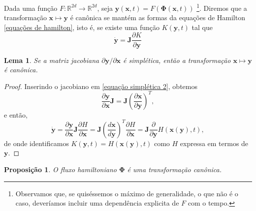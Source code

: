 \documentclass[
	12pt,
	oneside,			%
	a4paper,			%
	english,			%
	brazil				%
	]{abntex2}
\newtheorem{lema}{Lema}[chapter]
\newtheorem{proposicao}{Proposição}[chapter]
\theoremstyle{definition}
\begin{document}
Dada uma função $F:\mathbb{R}^{2d} \to \mathbb{R}^{2d}$, seja $\mathbf{y}(\mathbf{x},t) = F(\boldsymbol{\Phi}(\mathbf{x},t))$ \footnote{Observamos que, se quiséssemos o máximo de generalidade, o que não é o caso, deveríamos incluir uma dependência explicita de $F$ com o tempo.}. Diremos que a transformação $\mathbf{x} \mapsto \mathbf{y}$ é canônica se mantém as formas da equações de Hamilton \eqref{equações de hamilton}, isto é, se existe uma função $K(\mathbf{y},t)$ tal que
\begin{equation}
    \dot{\mathbf{y}} = \mathbf{J} \frac{\partial K}{\partial \mathbf{y}}
\end{equation}

\begin{lema}
\label{prop1}
    Se a matriz jacobiana $\partial \mathbf{y}/\partial \mathbf{x}$ é simplética, então a transformação $\mathbf{x} \mapsto \mathbf{y}$ é canônica.
\end{lema}
\begin{proof}
     Inserindo o jacobiano em \eqref{equação simplética 2}, obtemos
\begin{equation}
    \frac{\partial \mathbf{y}}{\partial \mathbf{x}} \mathbf{J} = \mathbf{J} \left(\frac{\partial \mathbf{x}}{\partial \mathbf{y}} \right)^T,
\end{equation}
e então,
\begin{equation}
    \dot{\mathbf{y}} = \frac{\partial \mathbf{y}}{\partial \mathbf{x}} \mathbf{J} \frac{\partial H}{\partial \mathbf{x}} = \mathbf{J} \left(\frac{d \mathbf{x}}{d \mathbf{y}} \right)^T \frac{\partial H}{\partial \mathbf{x}} = \mathbf{J} \frac{\partial}{\partial \mathbf{y}} H( \mathbf{x}\left(\mathbf{y}\right),t ),
\end{equation}
de onde identificamos $K(\mathbf{y},t) = H( \mathbf{x}\left(\mathbf{y}\right),t )$ como $H$ expressa em termos de $\mathbf{y}$.
\end{proof}

\begin{proposicao}
O fluxo hamiltoniano $\boldsymbol{\Phi}$ é uma transformação canônica.
\end{proposicao}
\end{document}
